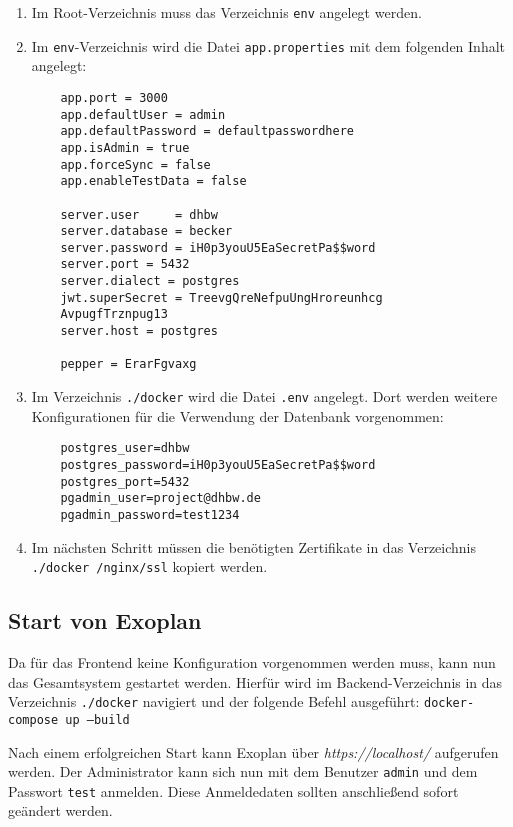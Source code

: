\begin{enumerate}
	\item Im Root-Verzeichnis muss das Verzeichnis \texttt{env} angelegt werden.
	\item Im \texttt{env}-Verzeichnis wird die Datei \texttt{app.properties} mit dem folgenden Inhalt angelegt:
	\begin{lstlisting}
	app.port = 3000
	app.defaultUser = admin
	app.defaultPassword = defaultpasswordhere
	app.isAdmin = true
	app.forceSync = false
	app.enableTestData = false
	
	server.user     = dhbw
	server.database = becker
	server.password = iH0p3youU5EaSecretPa$$word
	server.port = 5432
	server.dialect = postgres
	jwt.superSecret = TreevgQreNefpuUngHroreunhcg
	AvpugfTrznpug13
	server.host = postgres
	
	pepper = ErarFgvaxg
	\end{lstlisting}
	
	\item Im Verzeichnis \texttt{./docker} wird die Datei \texttt{.env} angelegt. Dort werden weitere Konfigurationen für die Verwendung der Datenbank vorgenommen:
	
	\begin{lstlisting}
	postgres_user=dhbw
	postgres_password=iH0p3youU5EaSecretPa$$word
	postgres_port=5432
	pgadmin_user=project@dhbw.de
	pgadmin_password=test1234
	\end{lstlisting}
	
	\item Im nächsten Schritt müssen die benötigten Zertifikate in das Verzeichnis \texttt{./docker
		/nginx/ssl} kopiert werden.
	
\end{enumerate}

\subsection{Start von Exoplan}

Da für das Frontend keine Konfiguration vorgenommen werden muss, kann nun das  Gesamtsystem gestartet werden. Hierfür wird im Backend-Verzeichnis in das Verzeichnis \texttt{./docker} navigiert und der folgende Befehl ausgeführt: \texttt{docker-compose up --build}

Nach einem erfolgreichen Start kann Exoplan über \textit{https://localhost/} aufgerufen werden. Der Administrator kann sich nun mit dem Benutzer \texttt{admin} und dem Passwort \texttt{test} anmelden. Diese Anmeldedaten sollten anschließend sofort geändert werden.

